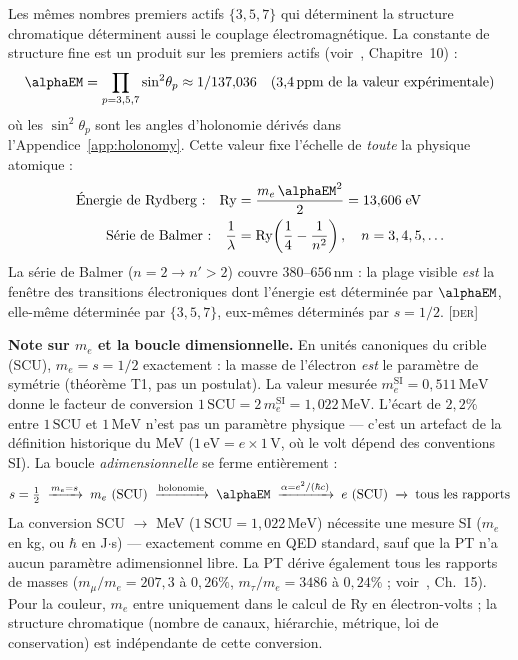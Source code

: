 \documentclass[12pt,a4paper]{article}
\begin{document}
\begin{derivedbox}
Les m\^emes nombres premiers actifs $\{3, 5, 7\}$ qui d\'eterminent la
structure chromatique d\'eterminent aussi le couplage
\'electromagn\'etique. La constante de structure fine est un produit
sur les premiers actifs (voir~\cite{senez2026math}, Chapitre~10) :
\begin{equation}
  \alphaEM = \prod_{p=3,5,7} \sin^2\!\theta_p
  \approx 1/137{,}036
  \quad\text{(3{,}4\,ppm de la valeur exp\'erimentale)}
  \label{eq:alpha}
\end{equation}
o\`u les $\sin^2\!\theta_p$ sont les angles d'holonomie d\'eriv\'es
dans l'Appendice~\ref{app:holonomy}. Cette valeur fixe l'\'echelle de
\emph{toute} la physique atomique :
\begin{align}
  \text{\'Energie de Rydberg :} \quad
  \mathrm{Ry} &= \frac{m_e\,\alphaEM^2}{2} = 13{,}606\;\mathrm{eV}
  \label{eq:rydberg} \\
  \text{S\'erie de Balmer :} \quad
  \frac{1}{\lambda} &= \mathrm{Ry}\!\left(\frac{1}{4} - \frac{1}{n^2}\right),
  \quad n = 3, 4, 5, \ldots
  \label{eq:balmer}
\end{align}
La s\'erie de Balmer ($n = 2 \to n' > 2$) couvre $380$--$656\,\mathrm{nm}$ :
la plage visible \emph{est} la fen\^etre des transitions \'electroniques
dont l'\'energie est d\'etermin\'ee par $\alphaEM$, elle-m\^eme
d\'etermin\'ee par $\{3, 5, 7\}$, eux-m\^emes d\'etermin\'es par
$s = 1/2$. \textsc{[der]}

\medskip\noindent
\textbf{Note sur $m_e$ et la boucle dimensionnelle.}\quad
En unit\'es canoniques du crible (SCU), $m_e = s = 1/2$ exactement :
la masse de l'\'electron \emph{est} le param\`etre de sym\'etrie
(th\'eor\`eme T1, pas un postulat). La valeur mesur\'ee
$m_e^{\mathrm{SI}} = 0{,}511\,\mathrm{MeV}$ donne le facteur de
conversion $1\,\mathrm{SCU} = 2\,m_e^{\mathrm{SI}} = 1{,}022\,\mathrm{MeV}$.
L'\'ecart de $2{,}2\%$ entre $1\,\mathrm{SCU}$ et $1\,\mathrm{MeV}$
n'est pas un param\`etre physique --- c'est un artefact de la
d\'efinition historique du MeV
($1\,\mathrm{eV} = e \times 1\,\mathrm{V}$, o\`u le volt d\'epend
des conventions SI). La boucle \emph{adimensionnelle} se ferme enti\`erement :
\[
  s = \tfrac{1}{2}
  \;\xrightarrow{m_e = s}\;
  m_e \text{ (SCU)}
  \;\xrightarrow{\text{holonomie}}\;
  \alphaEM
  \;\xrightarrow{\alpha = e^2/(\hbar c)}\;
  e \text{ (SCU)}
  \;\xrightarrow{}\;
  \text{tous les rapports}
\]
La conversion SCU $\to$ MeV ($1\,\mathrm{SCU} = 1{,}022\,\mathrm{MeV}$)
n\'ecessite une mesure SI ($m_e$ en kg, ou $\hbar$ en J$\cdot$s) ---
exactement comme en QED standard, sauf que la PT n'a aucun param\`etre
adimensionnel libre.
La PT d\'erive \'egalement tous les rapports de masses
($m_\mu/m_e = 207{,}3$ \`a $0{,}26\%$,
$m_\tau/m_e = 3486$ \`a $0{,}24\%$ ;
voir~\cite{senez2026math}, Ch.~15). Pour la couleur,
$m_e$ entre uniquement dans le calcul de Ry en \'electron-volts ;
la structure chromatique (nombre de canaux, hi\'erarchie,
m\'etrique, loi de conservation) est ind\'ependante de cette
conversion.
\end{derivedbox}
\end{document}

